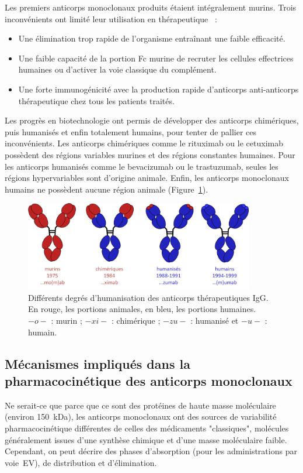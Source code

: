 Les premiers anticorps monoclonaux produits étaient intégralement murins. Trois inconvénients ont limité leur utilisation en thérapeutique~\citep{REF17} :
\begin{itemize}
\item Une élimination trop rapide de l'organisme entraînant une faible efficacité.
\item Une faible capacité de la portion Fc murine de recruter les cellules effectrices humaines ou d'activer la voie classique du complément.
\item Une forte immunogénicité avec la production rapide d'anticorps anti-anticorps thérapeutique chez tous les patients traités.
\end{itemize}
Les progrès en biotechnologie ont permis de développer des anticorps chimériques, puis humanisés et enfin totalement humains, pour tenter de pallier ces inconvénients. Les anticorps chimériques comme le rituximab ou le cetuximab possèdent des régions variables murines et des régions constantes humaines. Pour les anticorps humanisés comme le bevacizumab ou le trastuzumab, seules les régions hypervariables sont d'origine animale. Enfin, les anticorps monoclonaux humains ne possèdent aucune région animale (Figure~\ref{fig:12}).

\begin{figure}[htbp]
	\centering
		\includegraphics[width=10cm]{figures/raster/FIG_12}
	\caption[Différents degrés d'humanisation des anticorps thérapeutiques IgG.]{Différents degrés d'humanisation des anticorps thérapeutiques IgG. En rouge, les portions animales, en bleu, les portions humaines. $-o-$ : murin ; $-xi-$ : chimérique ; $-zu-$ : humanisé et $-u-$ : humain.}
	\label{fig:12}
\end{figure}

\subsection{Mécanismes impliqués dans la pharmacocinétique des anticorps monoclonaux}
Ne serait-ce que parce que ce sont des protéines de haute masse moléculaire (environ 150~k\gls{Da}), les anticorps monoclonaux ont des sources de variabilité pharmacocinétique différentes de celles des médicaments "classiques", molécules généralement issues d'une synthèse chimique et d'une masse moléculaire faible. Cependant, on peut décrire des phases d'absorption (pour les administrations par voie~\gls{EV}), de distribution et d'élimination.

